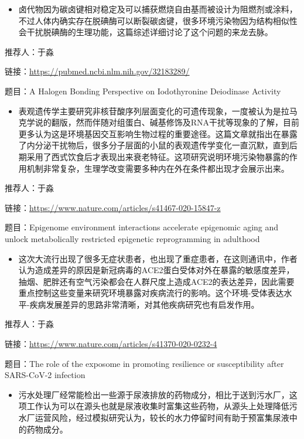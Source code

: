 \documentclass[
]{book}
\providecommand{\tightlist}{%
  \setlength{\itemsep}{0pt}\setlength{\parskip}{0pt}}
\begin{document}
\begin{itemize}
\tightlist
\item
  卤代物因为碳卤键相对稳定及可以捕获燃烧自由基而被设计为阻燃剂或涂料，不过人体内确实存在脱碘酶可以断裂碳卤键，很多环境污染物因为结构相似性会干扰脱碘酶的生理功能，这篇综述详细讨论了这个问题的来龙去脉。
\end{itemize}

推荐人：于淼

链接：\url{https://pubmed.ncbi.nlm.nih.gov/32183289/}

题目：A Halogen Bonding Perspective on Iodothyronine Deiodinase Activity

\begin{itemize}
\tightlist
\item
  表观遗传学主要研究非核苷酸序列层面变化的可遗传现象，一度被认为是拉马克学说的翻版，然而伴随对组蛋白、碱基修饰及RNA干扰等现象的了解，目前更多认为这是环境基因交互影响生物过程的重要途径。这篇文章就指出在暴露了内分泌干扰物后，很多分子层面的小鼠的表观遗传学变化一直沉默，直到后期采用了西式饮食后才表现出来衰老特征。这项研究说明环境污染物暴露的作用机制非常复杂，生理学改变需要多种内在外在条件都出现才会展示出来。
\end{itemize}

推荐人：于淼

链接：\url{https://www.nature.com/articles/s41467-020-15847-z}

题目：Epigenome environment interactions accelerate epigenomic aging and unlock metabolically restricted epigenetic reprogramming in adulthood

\begin{itemize}
\tightlist
\item
  这次大流行出现了很多无症状患者，也出现了重症患者，在这则通讯中，作者认为造成差异的原因是新冠病毒的ACE2蛋白受体对外在暴露的敏感度差异，抽烟、肥胖还有空气污染都会在人群尺度上造成ACE2的表达差异，因此需要重点控制这些变量来研究环境暴露对疾病流行的影响。这个环境-受体表达水平-疾病发展差异的思路非常清晰，对其他疾病研究也有启发作用。
\end{itemize}

推荐人：于淼

链接：\url{https://www.nature.com/articles/s41370-020-0232-4}

题目：The role of the exposome in promoting resilience or susceptibility after SARS-CoV-2 infection

\begin{itemize}
\tightlist
\item
  污水处理厂经常能检出一些源于尿液排放的药物成分，相比于送到污水厂，这项工作认为可以在源头也就是尿液收集时富集这些药物，从源头上处理降低污水厂运营风险，经过模拟研究认为，较长的水力停留时间有助于预富集尿液中的药物成分。
\end{itemize}
\end{document}
